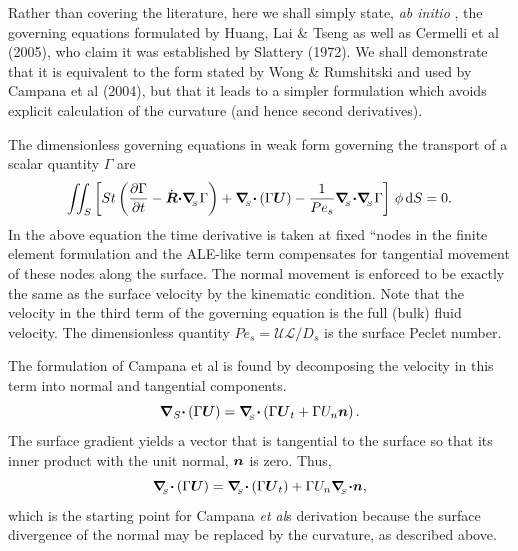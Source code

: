 Rather than covering the literature, here we shall simply state, {\itshape  ab initio }, the governing equations formulated by Huang, Lai \& Tseng as well as Cermelli et al (2005), who claim it was established by Slattery (1972). We shall demonstrate that it is equivalent to the form stated by Wong \& Rumshitski and used by Campana et al (2004), but that it leads to a simpler formulation which avoids explicit calculation of the curvature (and hence second derivatives).

The dimensionless governing equations in weak form governing the transport of a scalar quantity $ \Gamma $ are \[ \int\!\!\!\int_{S} \left[ St \left(\frac{\partial \Gamma}{\partial t} - \dot{\mbox{\boldmath$R$}} \mbox{\boldmath$\cdot$} \mbox{\boldmath$\nabla$}_{\!\!_{S}} \Gamma \right) + \mbox{\boldmath$\nabla$}_{\!\!_{S}} \mbox{\boldmath$\cdot$} \left(\Gamma \mbox{\boldmath$U$}\right) - \frac{1}{Pe_{s}} \mbox{\boldmath$\nabla$}_{\!\!_{S}}\mbox{\boldmath$\cdot$} \mbox{\boldmath$\nabla$}_{\!\!_{S}} \Gamma \right]\, \phi\, \mbox{d}S = 0. \] In the above equation the time derivative is taken at fixed ``nodes\textquotesingle{}\textquotesingle{} in the finite element formulation and the A\+L\+E-\/like term compensates for tangential movement of these nodes along the surface. The normal movement is enforced to be exactly the same as the surface velocity by the kinematic condition. Note that the velocity in the third term of the governing equation is the full (bulk) fluid velocity. The dimensionless quantity $ Pe_s = \mathcal{U}\mathcal{L} / D_{s} $ is the surface Peclet number.

The formulation of Campana et al is found by decomposing the velocity in this term into normal and tangential components. \[ \mbox{\boldmath$\nabla$}_{S} \mbox{\boldmath$\cdot$} \left(\Gamma \mbox{\boldmath$U$}\right) = \mbox{\boldmath$\nabla$}_{\!\!_{S}} \mbox{\boldmath$\cdot$} \left(\Gamma \mbox{\boldmath$U$}_{t} + \Gamma U_{n} \mbox{\boldmath$n$} \right). \] The surface gradient yields a vector that is tangential to the surface so that its inner product with the unit normal, $ \mbox{\boldmath$n$}$ is zero. Thus, \[ \mbox{\boldmath$\nabla$}_{\!\!_{S}} \mbox{\boldmath$\cdot$} \left(\Gamma \mbox{\boldmath$U$}\right) = \mbox{\boldmath$\nabla$}_{\!\!_{S}} \mbox{\boldmath$\cdot$} \left(\Gamma \mbox{\boldmath$U$}_{t}\right) + \Gamma U_{n} \mbox{\boldmath$\nabla$}_{\!\!_{S}} \mbox{\boldmath$\cdot n$}, \] which is the starting point for Campana {\itshape  et al}\textquotesingle{}s derivation because the surface divergence of the normal may be replaced by the curvature, as described above.

